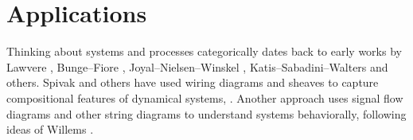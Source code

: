 \documentclass[reqno]{amsart}
\begin{document}

\section{Applications}\label{Applications}

 Thinking about systems and processes categorically dates back to early works by Lawvere \cite{Lawvere}, Bunge--Fiore \cite{BungeFiore}, Joyal--Nielsen--Winskel \cite{JNW}, Katis--Sabadini--Walters \cite{KSW} and others.   Spivak and others have used wiring diagrams and sheaves to capture compositional features of dynamical systems, \cite{BFV,SSV,VSL}.  Another approach uses signal flow diagrams and other string diagrams \cite{BE,BSZ,FRS} to understand systems behaviorally, following ideas of Willems \cite{Willems}.  
 
\end{document}
